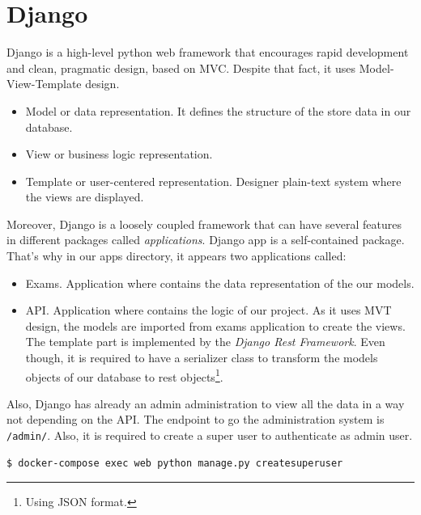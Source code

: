 \documentclass{article}
\begin{document}
\section{Django}
Django is a high-level python web framework that encourages rapid development and clean, pragmatic design, based on MVC. Despite that fact, it uses Model-View-Template design.
\begin{itemize}
	\item Model or data representation. It defines the structure of the store data in our database.
	\item View or business logic representation.
	\item Template or user-centered representation. Designer plain-text system where the views are displayed.
\end{itemize}
Moreover, Django is a loosely coupled framework that can have several features in different packages called \textit{applications}. Django app is a self-contained package. That's why in our apps directory, it appears two applications called:
\begin{itemize}
	\item Exams. Application where contains the data representation of the our models.
	\item API. Application where contains the logic of our project. As it uses MVT design, the models are imported from exams application to create the views. The template part is implemented by the \textit{Django Rest Framework}. Even though, it is required to have a serializer class to transform the models objects of our database to rest objects\footnote{Using JSON format.}.
\end{itemize}
Also, Django has already an admin administration to view all the data in a way not depending on the API. The endpoint to go the administration system is \texttt{/admin/}. Also, it is required to create a super user to authenticate as admin user.
\begin{verbatim}
$ docker-compose exec web python manage.py createsuperuser
\end{verbatim}
\end{document}
